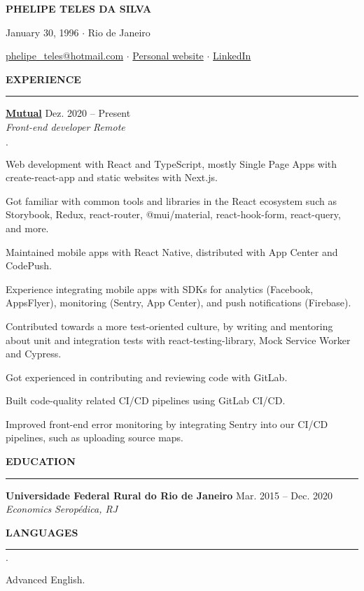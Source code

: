 \documentclass[12pt,letterpaper]{article}
\newenvironment{tightlist}
  {\begin{list}
    {$\cdot$}
    {
      \setlength{\leftmargin}{0em}
      \setlength{\itemsep}{-\smallskipamount}
    }
  }
{\end{list}}
\begin{document}
\pagestyle{empty}

\centerline{\huge\bf PHELIPE TELES DA SILVA}
\medskip

\centerline{January 30, 1996 $\cdot$ Rio de Janeiro}
\smallskip

\centerline{
  \href{mailto:phelipe_teles@hotmail.com}{phelipe\_teles@hotmail.com}
  $\cdot$
  \href{https://phelipetls.github.io}{Personal website}
  $\cdot$
  \href{https://linkedin.com/in/phelipeteles}{LinkedIn}
}
\smallskip

\medskip \textbf{EXPERIENCE} \medskip
\hrule

\textbf{\href{https://mutual.club}{Mutual}} \hfill Dez. 2020 -- Present \\
\emph{Front-end developer} \hfill \emph{Remote} {\parfillskip=0pt\par}

\begin{tightlist}
  \item Web development with React and TypeScript, mostly Single Page Apps with
    create-react-app and static websites with Next.js.
  \item Got familiar with common tools and libraries in the React ecosystem such
    as Storybook, Redux, react-router, @mui/material, react-hook-form,
    react-query, and more.
  \item Maintained mobile apps with React Native, distributed with App Center
    and CodePush.
  \item Experience integrating mobile apps with SDKs for analytics (Facebook,
    AppsFlyer), monitoring (Sentry, App Center), and push notifications
    (Firebase).
  \item Contributed towards a more test-oriented culture, by writing and
    mentoring about unit and integration tests with react-testing-library, Mock
    Service Worker and Cypress.
  \item Got experienced in contributing and reviewing code with GitLab.
  \item Built code-quality related CI/CD pipelines using GitLab CI/CD.
  \item Improved front-end error monitoring by integrating Sentry into our CI/CD
    pipelines, such as uploading source maps.
\end{tightlist}

\medskip \textbf{EDUCATION} \medskip
\hrule

\textbf{Universidade Federal Rural do Rio de Janeiro} \hfill {Mar. 2015 -- Dec. 2020} \\
\emph{Economics} \hfill \emph{Seropédica, RJ} {\parfillskip=0pt\par}

\medskip \textbf{LANGUAGES} \medskip
\hrule

\begin{tightlist}
  \item Advanced English.
\end{tightlist}
\end{document}
